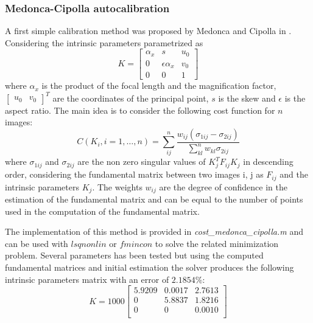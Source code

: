 \documentclass[11pt]{article}
\begin{document}
\subsubsection{Medonca-Cipolla autocalibration}
A first simple calibration method was proposed by Medonca and Cipolla in \cite{Medonca99}. Considering the intrinsic parameters parametrized as
\begin{equation}
    K = \begin{bmatrix}
        \alpha_x & s & u_0 \\
        0   & \epsilon\alpha_x & v_0 \\
        0 & 0 & 1
    \end{bmatrix}
\end{equation}
where $\alpha_x$ is the product of the focal length and the magnification factor, $\begin{bmatrix}
    u_0 & v_0
\end{bmatrix}^T$ are the coordinates of the principal point, $s$ is the skew and $\epsilon$ is the aspect ratio. The main idea is to consider the following cost function for $n$ images:
\begin{equation}
    C(K_i, i = 1,\dots, n) = \sum_{ij}^{n} \frac{w_{ij} (\sigma_{1ij}-\sigma_{2ij})}{\sum_{kl}^{n}w_{kl} \sigma_{2ij}}
\end{equation}
where $\sigma_{1ij}$ and $\sigma_{2ij}$ are the non zero singular values of $K_j^TF_{ij}K_j$ in descending order, considering the fundamental matrix between two images i, j as $F_{ij}$ and the intrinsic parameters $K_j$. The weights $w_{ij}$ are the degree of confidence in the estimation of the fundamental matrix and can be equal to the number of points used in the computation of the fundamental matrix.

\bigskip
The implementation of this method is provided in \textit{cost\_medonca\_cipolla.m} and can be used with $lsqnonlin$ or $fmincon$ to solve the related minimization problem. Several parameters has been tested but using the computed fundamental matrices and initial estimation the solver produces the following intrinsic parameters matrix with an error of $2.1854\%$:
\begin{equation}
    K = 1000 \begin{bmatrix}
 
     5.9209  &  0.0017    &2.7613\\
          0  &  5.8837   & 1.8216\\
          0  &       0  &  0.0010\\ 
\end{bmatrix}
\end{equation}
\end{document}
